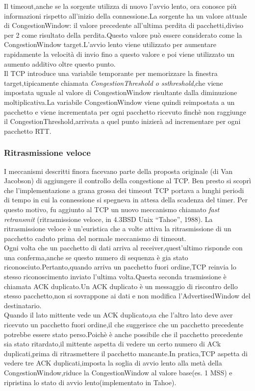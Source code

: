 Il timeout,anche se la sorgente utilizza di nuovo l'avvio lento, ora conosce più informazioni rispetto all'inizio della connessione.La sorgente ha un valore attuale di CongestionWindow: il valore precedente all'ultima perdita di pacchetti,diviso per 2 come risultato della perdita.Questo valore può essere considerato come la CongestionWindow target.L'avvio lento viene utilizzato per aumentare rapidamente la velocità di invio fino a questo valore e poi viene utilizzato un aumento additivo oltre questo punto.\\
Il TCP introduce una variabile temporante per memorizzare la finestra target,tipicamente chiamata \textit{CongestionThreshold o ssthreshold},che viene impostata uguale al valore di CongestionWindow risultante dalla diminuzione moltiplicativa.La variabile CongestionWindow viene quindi reimpostata a un pacchetto e viene incrementata per ogni pacchetto ricevuto finchè non raggiunge il CongestionThreshold,arrivata a quel punto inizierà ad incrementare per ogni pacchetto RTT.
\subsubsection{Ritrasmissione veloce}
I meccanismi descritti finora facevano parte della proposta originale (di Van Jacobson) di aggiungere il controllo della congestione al TCP. Ben presto si scoprì che l’implementazione a grana grossa dei timeout TCP portava a lunghi periodi di tempo in cui la connessione si spegneva in attesa della scadenza del timer. Per questo motivo, fu aggiunto al TCP un nuovo meccanismo chiamato \textit{fast retransmit} (ritrasmissione veloce, in 4.3BSD Unix “Tahoe”, 1988). La ritrasmissione veloce è un’euristica che a volte attiva la ritrasmissione di un pacchetto caduto prima del normale meccanismo di timeout.\\
Ogni volta che un pacchetto di dati arriva al receiver,quest'ultimo risponde con una conferma,anche se questo numero di sequenza è gia stato riconosciuto.Pertanto,quando arriva un pacchetto fuori ordine,TCP reinvia lo stesso riconoscimento inviato l'ultima volta.Questa seconda trasmissione è chiamata ACK duplicato.Un ACK duplicato è un messaggio di riscontro dello stesso pacchetto,non si sovrappone ai dati e non modifica l'AdvertisedWindow del destinatario.\\
Quando il lato mittente vede un ACK duplicato,sa che l'altro lato deve aver ricevuto un pacchetto fuori ordine,il che suggerisce che un pacchetto precedente potrebbe essere stato perso.Poichè è anche possibile che il pacchetto precedente sia stato ritardato,il mittente aspetta di vedere un certo numero di ACk duplicati,prima di ritrasmettere il pacchetto mancante.In pratica,TCP aspetta di vedere tre ACK duplicati,imposta la soglia di avvio lento alla metà della CongestionWindow,riduce la CongestionWindow al valore base(es. 1 MSS) e ripristina lo stato di avvio lento(implementato in Tahoe).
